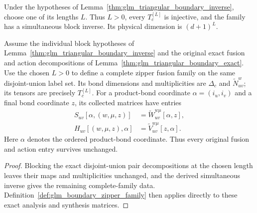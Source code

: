 \begin{definition}
    \leanok
    \label{def:glm_triangular_boundary_length}
    Under the hypotheses of
    Lemma~\ref{thm:glm_triangular_boundary_inverse}, choose one of its
    lengths $L$. Thus $L>0$, every $T_c^{[L]}$ is injective, and the family
    has a simultaneous block inverse. Its physical dimension is
    $(d+1)^L$.
\end{definition}

\begin{definition}
    \leanok
    \label{def:glm_triangular_boundary_complete}
    Assume the individual block hypotheses of
    Lemma~\ref{thm:glm_triangular_boundary_inverse} and the original
    exact fusion and action decompositions of
    Lemma~\ref{thm:glm_triangular_boundary_exact}.
    Use the chosen $L>0$ to define a complete zipper fusion family on the
    same disjoint-union label set. Its bond dimensions and multiplicities
    are $\Delta_c$ and $\widetilde N_{uv}^w$; its tensors are precisely
    $T_c^{[L]}$. For a product-bond coordinate $\alpha=(i_u,i_v)$ and
    a final bond coordinate $z$, its collected matrices have entries
    \begin{align}
        S_{uv}[\alpha,(w,\mu,z)]
         & =\widetilde W_{uv}^{w\mu}[\alpha,z],
        \label{eq:glm_triangular_preserved_synthesis} \\
        H_{uv}[(w,\mu,z),\alpha]
         & =\widetilde V_{uv}^{w\mu}[z,\alpha].
        \label{eq:glm_triangular_preserved_analysis}
    \end{align}
    Here $\alpha$ denotes the ordered product-bond coordinate. Thus every
    original fusion and action entry survives unchanged.
\end{definition}
\begin{proof}
    \leanok
    Blocking the exact disjoint-union pair decompositions at the chosen
    length leaves their maps and multiplicities unchanged, and the derived
    simultaneous inverse gives the remaining complete-family data.
    Definition~\ref{def:glm_boundary_zipper_family} then applies directly to
    these exact analysis and synthesis matrices.
\end{proof}
